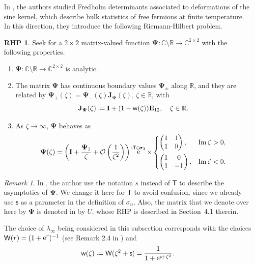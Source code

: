 \documentclass[reqno,a4paper,11pt]{amsart}
\DeclareMathOperator{\im}{Im}
\DeclareMathOperator{\ee}{\rm e}
\newcommand{\C}{\mathbb{C}}
\newcommand{\R}{\mathbb{R}}
\newcommand{\Boh}{\mathcal{O}}
\newcommand{\ii}{\mathrm{i}}
\newcommand*{\deff}{\mathrel{\vcenter{\baselineskip0.5ex \lineskiplimit0pt
                     \hbox{\scriptsize.}\hbox{\scriptsize.}}}%
                     =}
\renewcommand{\bm}{\mathbf}
\newcommand{\msf}{\mathsf}
\renewcommand{\sp}{\boldsymbol \sigma}
\newcommand{\sad}{\msf s}
\theoremstyle{definition}
\newtheorem{rhp}[theorem]{RHP}
\theoremstyle{remark}
\newtheorem{remark}[theorem]{Remark}
\numberwithin{equation}{section}
\newcommand*{\defeq}{\mathrel{\vcenter{\baselineskip0.5ex \lineskiplimit0pt
                     \hbox{\scriptsize.}\hbox{\scriptsize.}}}%
                     =}
\begin{document}
In \cite{ClaeysTarricone24}, the authors studied Fredholm determinants associated to deformations of the sine kernel, which describe bulk statistics of free fermions at finite temperature. In this direction, they introduce the following Riemann-Hilbert problem.
%
\begin{rhp} \label{RHP:PsiCT}
Seek for a $2\times 2$ matrix-valued function $\bm \Psi:\C\setminus \R\to \C^{2\times 2}$ with the following properties.
\begin{enumerate}[\rm (i)]
\item $\bm \Psi:\C\setminus \R\to \C^{2\times 2}$ is analytic.
\item The matrix $\bm \Psi$ has continuous boundary values $\bm \Psi_\pm$ along $\R$, and they are related by $\bm \Psi_+(\zeta)=\bm \Psi_-(\zeta)\bm J_{\bm \Psi}(\zeta)$, $\zeta\in \R$, with
%
$$
\bm J_{\bm \Psi}(\zeta)\deff 
    \bm I+(1-\msf w(\zeta))\bm E_{12},\quad \zeta \in \R.
$$
%
\item As $\zeta\to \infty$, $\bm \Psi$ behaves as
%
$$
\bm \Psi(\zeta)=\left(\bm I+ \frac{\bm \Psi_1}{\zeta} + \Boh\left(\frac{1}{\zeta^{2}}\right)\right) \ee^{\ii \msf T\zeta\sp_3} \times 
\begin{dcases}
\begin{pmatrix}
    1 & 1\\ 1 & 0
\end{pmatrix}, & \im\zeta>0, \\ 
\begin{pmatrix}
    1 & 0\\ 1 & -1
\end{pmatrix}, & \im\zeta<0.
\end{dcases}
$$
\end{enumerate}
\end{rhp}

\begin{remark}\label{remark:ClaeysTarricone}
    In \cite{ClaeysTarricone24}, the author use the notation $s$ instead of $\msf T$ to describe the asymptotics of $\bm \Psi$. We change it here for $\msf T$ to avoid confusion, since we already use $\sad$ as a parameter in the definition of $\sigma_n$. Also, the matrix that we denote over here by $\bm \Psi$ is denoted in \cite{ClaeysTarricone24} by $U$, whose RHP is described in Section~4.1 therein.
\end{remark}

    The choice of $\lambda_\infty$ being considered in this subsection corresponds with the choices $\msf W(r)=(1+\ee^{r})^{-1}$ (see Remark 2.4 in \cite{ClaeysTarricone24}) and \begin{equation}\label{eq:deff_w}
        \msf w(\zeta) \defeq \msf W(\zeta^2+\sad) = \frac{1}{1 + \ee^{\sad + \zeta^2}}.
    \end{equation}
        
\end{document}
